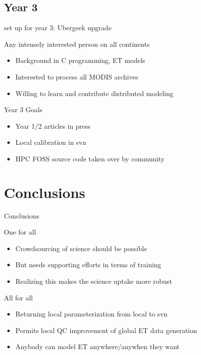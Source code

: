 \documentclass[xcolor=dvipsnames,beamer]{beamer} %
\begin{document}
\subsection{Year 3}
\begin{frame}[fragile]{set up for year 3: Ubergeek upgrade}

Any intensely interested person on all continents
\begin{itemize}
 \item Background in C programming, ET models
 \item Interested to process all MODIS archives
 \item Willing to learn and contribute distributed modeling
\end{itemize}


\begin{block}{Year 3 Goals}
\begin{itemize}
 \item Year 1/2 articles in press
 \item Local calibration in svn
 \item HPC FOSS source code taken over by community
\end{itemize}
\end{block}

\end{frame}

\section{Conclusions}
\begin{frame}[fragile]{Conclusions}

One for all
\begin{itemize}
 \item Crowdsourcing of science should be possible
 \item But needs supporting efforts in terms of training
 \item Realizing this makes the science uptake more robust
\end{itemize}

\begin{block}{All for all}
\begin{itemize}
 \item Returning local parameterization from local to svn
 \item Permits local QC improvement of global ET data generation
 \item Anybody can model ET anywhere/anywhen they want
\end{itemize}
\end{block}

\end{frame}
\end{document}
